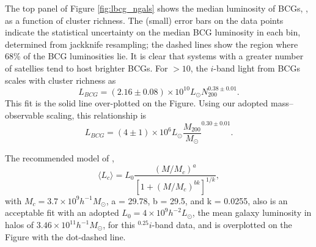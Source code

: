\documentclass{emulateapj}
\begin{document}
The top panel of Figure \ref{fig:lbcg_ngals} shows the median
luminosity of BCGs, \Lbcg, as a function of cluster richness. The
(small) error bars on the data points indicate the statistical
uncertainty on the median BCG luminosity in each bin, determined from jackknife resampling; the dashed lines
show the region where 68\% of the BCG luminosities lie. It is clear
that systems with a greater number of satellies tend to host brighter
BCGs. For \Ntwo$ > 10$, the $i$-band light from BCGs scales with
cluster richness as
\begin{equation}
L_{BCG} = (2.16 \pm 0.08) \times 10^{10} L_{\odot} N_{200}^{0.38 \pm 0.01}. 
\end{equation}
This fit is the solid line over-plotted on the Figure. Using our adopted mass--observable scaling, this relationship is 
\begin{equation}
L_{BCG} = (4 \pm 1) \times 10^6  L_{\odot} \frac{M_{200}}{M_{\odot}}^{0.30 \pm 0.01}. 
\end{equation}


The recommended model of \citet{VO06},
\begin{equation}
\langle L_c \rangle = L_0 \frac{(M/M_c)^a}{[1+(M/M_c)^{bk}]^{1/k}},
\end{equation}
with $M_c = 3.7 \times 10^9 h^{-1}M_{\odot}$, a = 29.78, b = 29.5, and k = 0.0255,
also is an acceptable fit with an adopted $L_0 = 4 \times 10^9 h^{-2} L_{\odot}$, the mean galaxy luminosity in halos of $3.46 \times 10^{11}h^{-1}M_{\odot}$, for this $^{0.25}i$-band data, and is overplotted on the Figure with the dot-dashed line.
\end{document}
